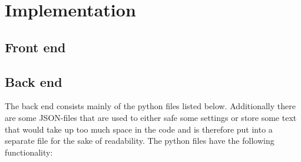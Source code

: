 \chapter{Implementation} \label{Implementation}

\section{Front end}

\section{Back end}

The back end consists mainly of the python files listed below. Additionally there are some \acs{JSON}-files that are used to either safe some settings or store some text that would take up too much space in the code and is therefore put into a separate file for the sake of readability. The python files have the following functionality:

